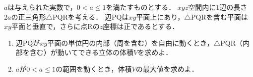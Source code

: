 $a$は与えられた実数で，$0<a\le 1$を満たすものとする．
$xyz$空間内に$1$辺の長さ$2a$の正三角形$\triangle \mathrm{PQR}$を考える．
辺$\mathrm{PQ}$は$xy$平面上にあり，$\triangle\mathrm{PQR}$を含む平面は$xy$平面と垂直で，さらに点$\mathrm{R}$の$z$座標は正であるとする．
\begin{enumerate}
  \item 辺$\mathrm{PQ}$が$xy$平面の単位円の内部（周を含む）を自由に動くとき，$\triangle\mathrm{PQR}$（内部を含む）が動いてできる立体の体積$V$を求めよ．
  \item $a$が$0<a\le 1$の範囲を動くとき，体積$V$の最大値を求めよ．
\end{enumerate}